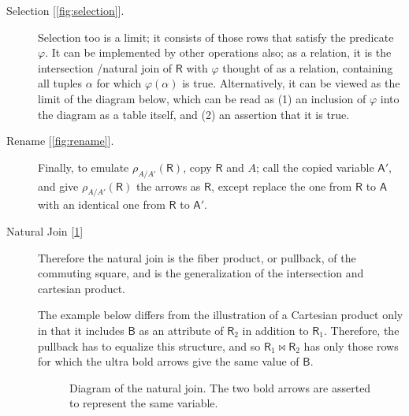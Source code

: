 \documentclass{article}
\theoremstyle{plain}
\theoremstyle{definition}
\theoremstyle{remark}
\newcommand{\var}[1]{\mathsf{#1}}
\newlength\todolength
\newcommand{\todo}[1]{
		\colorbox{red!60!black}{\parbox{\todolength}{\color{white}$\mathrlap{\textbf{todo}}${\hspace{0.12ex}}\textbf{todo}: #1}}
}
\begin{document}
\begin{description}
\item[{Selection [\cref{fig:selection}].}]
Selection too is a limit; it consists of those rows that satisfy the predicate $\varphi$. 
It can be implemented by other operations also; as a relation, it is the intersection /natural join of $\var R$ with $\varphi$ thought of as a relation, containing all tuples $\alpha$ for which $\varphi(\alpha)$ is true. Alternatively, it can be viewed as the limit of the diagram below, which can be read as (1) an inclusion of $\varphi$ into the diagram as a table itself, and (2) an assertion that it is true.

\item[{Rename [\cref{fig:rename}].}]
Finally, to emulate $\rho_{A/A'}(\var R)$, copy $\var R$ and $A$; call the copied variable $\var A'$, and give $\rho_{A/A'}(\var R)$ the arrows as $\var R$, except replace the one from $\var R$ to $\var A$ with an identical one from $\var R$ to $\var A'$. 




\item[{Natural Join [\cref{fig:natjoin}]}]

Therefore the natural join is the fiber product, or pullback, of the commuting square, and is the generalization of the intersection and cartesian product.

The example below differs from the illustration of a Cartesian product only in that it includes $\var B$ as an attribute of $\var R_2$ in addition to $\var R_1$. Therefore, the pullback has to equalize this structure, and so $\var R_1 \bowtie \var R_2$ has only those rows for which the ultra bold arrows give the same value of $\var B$. 
\begin{figure}
	\centering
\caption{Diagram of the natural join. The two bold arrows are asserted to represent the same variable.}\label{fig:natjoin}
\end{figure}
\end{description}
\end{document}
